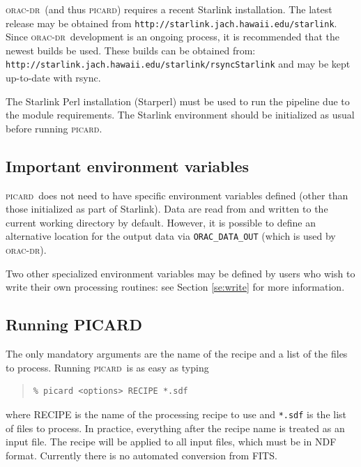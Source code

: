 \documentclass[twoside,11pt]{article}
\newcommand{\htmladdnormallink}[2]{#1}
\renewcommand{\_}{\texttt{\symbol{95}}}
\newenvironment{myquote}{\begin{quote}\begin{small}}{\end{small}\end{quote}}
\newcommand{\oracdr}{\textsc{orac-dr}}
\newcommand{\picard}{\textsc{picard}}
\newcommand{\task}[1]{\textsf{#1}}
\begin{document}
\oracdr\ (and thus \picard) requires a recent Starlink
installation. The latest release may be obtained from
\htmladdnormallink{\texttt{http://starlink.jach.hawaii.edu/starlink}}{http://starlink.jach.hawaii.edu/starlink}. Since
\oracdr\ development is an ongoing process, it is recommended that the
newest builds be used. These builds can be obtained from:
\htmladdnormallink{\texttt{http://starlink.jach.hawaii.edu/starlink/rsyncStarlink}}{http://starlink.jach.hawaii.edu/starlink/rsyncStarlink}
and may be kept up-to-date with rsync.

The Starlink Perl installation (Starperl) must be used to run the
pipeline due to the module requirements. The Starlink environment
should be initialized as usual before running \picard.

\subsection{Important environment variables}

\picard\ does not need to have specific environment variables defined
(other than those initialized as part of Starlink). Data are read from
and written to the current working directory by default. However, it
is possible to define an alternative location for the output data via
\verb+ORAC_DATA_OUT+ (which is used by \oracdr).

Two other specialized environment variables may be defined by users
who wish to write their own processing routines: see Section
\ref{se:write} for more information.

\subsection{Running PICARD}

The only mandatory arguments are the name of the recipe and a list of
the files to process. Running \picard\ is as easy as typing
\begin{myquote}
\begin{verbatim}
% picard <options> RECIPE *.sdf
\end{verbatim}
\end{myquote}
where \task{RECIPE} is the name of the processing recipe to use and
\verb+*.sdf+ is the list of files to process. In practice, everything
after the recipe name is treated as an input file. The recipe will be
applied to all input files, which must be in NDF format. Currently
there is no automated conversion from FITS.
\end{document}
